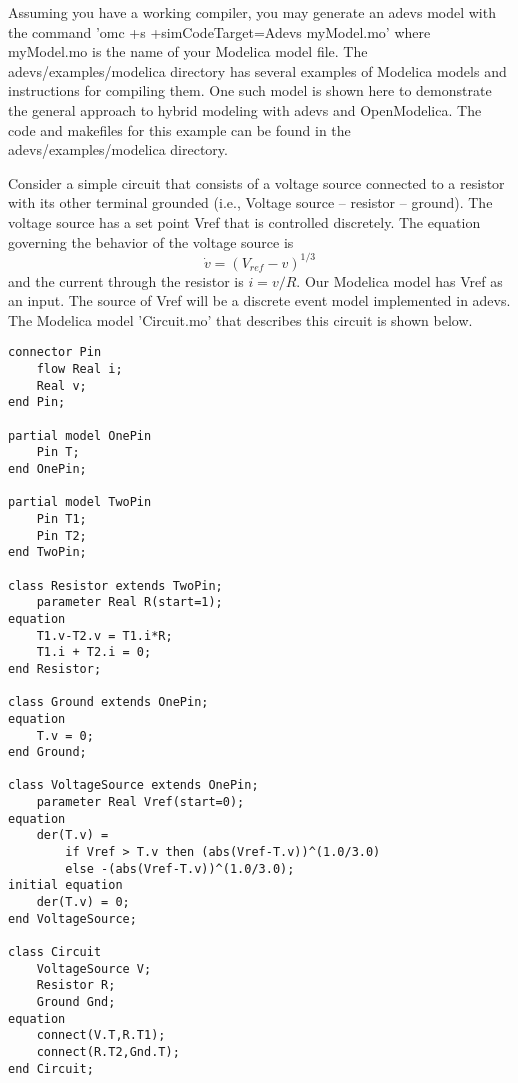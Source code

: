 Assuming you have a working compiler, you may generate an adevs model with the command 'omc +s +simCodeTarget=Adevs myModel.mo' where myModel.mo is the name of your Modelica model file. The adevs/examples/modelica directory has several examples of Modelica models and instructions for compiling them. One such model is shown here to demonstrate the general approach to hybrid modeling with adevs and OpenModelica. The code and makefiles for this example can be found in the adevs/examples/modelica directory.

Consider a simple circuit that consists of a voltage source connected to a resistor with its other terminal grounded (i.e., Voltage source -- resistor -- ground). The voltage source has a set point Vref that is controlled discretely. The equation governing the behavior of the voltage source is
\begin{equation*}
\dot{v} = (V_{ref} - v)^{1/3}
\end{equation*}
and the current through the resistor is $i = v/R$. Our Modelica model has Vref as an input. The source of Vref will be a discrete event model implemented in adevs. The Modelica model 'Circuit.mo' that describes this circuit is shown below.
\begin{verbatim}
connector Pin
    flow Real i;
    Real v;
end Pin;

partial model OnePin
    Pin T;
end OnePin;

partial model TwoPin
    Pin T1;
    Pin T2;
end TwoPin;

class Resistor extends TwoPin;
    parameter Real R(start=1);
equation
    T1.v-T2.v = T1.i*R;
    T1.i + T2.i = 0;
end Resistor;

class Ground extends OnePin;
equation
    T.v = 0;
end Ground;

class VoltageSource extends OnePin;
    parameter Real Vref(start=0);
equation
    der(T.v) = 
        if Vref > T.v then (abs(Vref-T.v))^(1.0/3.0)
        else -(abs(Vref-T.v))^(1.0/3.0);
initial equation
    der(T.v) = 0;
end VoltageSource;

class Circuit
    VoltageSource V;
    Resistor R;
    Ground Gnd;
equation
    connect(V.T,R.T1);
    connect(R.T2,Gnd.T);
end Circuit;
\end{verbatim}

